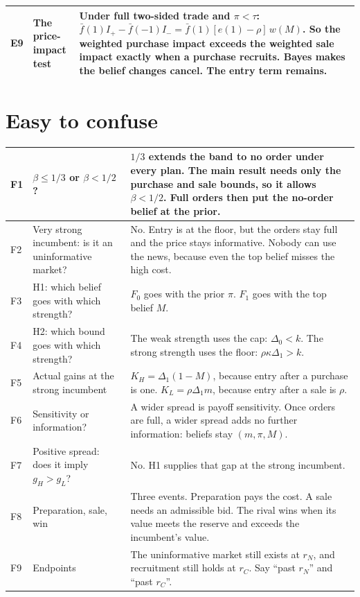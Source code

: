\documentclass[10.5pt]{article}
\makeatletter
\newenvironment{cards}{\begin{longtable}{@{}IQA@{}}}{\end{longtable}}
\newcommand{\card}[3]{#1 & #2 & #3\\\midrule}
\newcommand{\src}[1]{\par\vspace{-2pt}{\footnotesize\color{gr}#1}}
\makeatother
\begin{document}
\begin{cards}
\card{E9}{The price-impact test}{Under full two-sided trade and $\pi<\tau$: $\bar f(1)I_+-\bar f(-1)I_-=\bar f(1)[e(1)-\rho]\,w(M)$. So the weighted purchase impact exceeds the weighted sale impact exactly when a purchase recruits. Bayes makes the belief changes cancel. The entry term remains.\src{Paper §8, A8; frame 18}}
\end{cards}

\section{Easy to confuse}
\begin{cards}
\card{F1}{$\beta\le 1/3$ or $\beta<1/2$?}{$1/3$ extends the band to no order under every plan. The main result needs only the purchase and sale bounds, so it allows $\beta<1/2$. Full orders then put the no-order belief at the prior.}
\card{F2}{Very strong incumbent: is it an uninformative market?}{No. Entry is at the floor, but the orders stay full and the price stays informative. Nobody can use the news, because even the top belief misses the high cost.}
\card{F3}{H1: which belief goes with which strength?}{$F_0$ goes with the prior $\pi$. $F_1$ goes with the top belief $M$.}
\card{F4}{H2: which bound goes with which strength?}{The weak strength uses the cap: $\Delta_0<k$. The strong strength uses the floor: $\rho\kappa\Delta_1>k$.}
\card{F5}{Actual gains at the strong incumbent}{$K_H=\Delta_1(1-M)$, because entry after a purchase is one. $K_L=\rho\Delta_1m$, because entry after a sale is $\rho$.}
\card{F6}{Sensitivity or information?}{A wider spread is payoff sensitivity. Once orders are full, a wider spread adds no further information: beliefs stay $(m,\pi,M)$.}
\card{F7}{Positive spread: does it imply $g_H>g_L$?}{No. H1 supplies that gap at the strong incumbent.}
\card{F8}{Preparation, sale, win}{Three events. Preparation pays the cost. A sale needs an admissible bid. The rival wins when its value meets the reserve and exceeds the incumbent's value.}
\card{F9}{Endpoints}{The uninformative market still exists at $r_N$, and recruitment still holds at $r_C$. Say ``past $r_N$'' and ``past $r_C$''.}
\end{cards}
\end{document}
